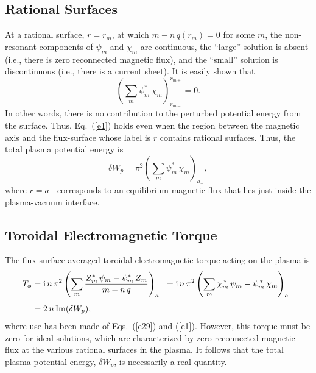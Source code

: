 \documentclass[12pt,prb,aps]{revtex4-1}
\begin{document}
\subsection{Rational Surfaces}
At a rational surface, $r=r_m$, at which $m-n\,q(r_m)=0$ for some $m$, the non-resonant components of $\psi_m$ and $\chi_m$ are continuous, the 
``large'' solution is absent (i.e., there is zero reconnected magnetic flux), and the ``small'' solution is discontinuous (i.e., there is a current sheet). It is easily shown that\,\cite{tj}
\begin{equation}
\left(\sum_m\psi_m^\ast\,\chi_m\right)_{r_{m-}}^{r_{m+}}=0.
\end{equation}
In other words, there is no contribution to the perturbed potential energy from the surface. Thus, Eq.~(\ref{e1}) holds even when the region between the
magnetic axis and the flux-surface whose label is $r$ contains rational surfaces. 
Thus, the total plasma potential energy is 
\begin{equation}\label{a32}
\delta W_p =\pi^2\left(\sum_m\psi_m^\ast\,\chi_m\right)_{a_-},
\end{equation}
where $r=a_-$ corresponds to an equilibrium magnetic flux that lies just inside the plasma-vacuum interface. 

\subsection{Toroidal Electromagnetic Torque}
The flux-surface averaged toroidal electromagnetic torque acting on the plasma   is\,\cite{tj,ideal}
\begin{align}
T_\phi& = {\rm i}\,n\,\pi^2\left(\sum_m\frac{Z_m^\ast\,\psi_m-\psi_m^\ast\,Z_m}{m-n\,q}\right)_{a_-}= {\rm i}\,n\,\pi^2\left(\sum_m
\chi_m^{\,\ast}\,\psi_m - \psi_m^{\,\ast}\,\chi_m\right)_{a_-}\nonumber\\[0.5ex]
&= 2\,n\,{\rm Im}(\delta W_p),
\end{align}
where use has been made of Eqs.~(\ref{e29}) and (\ref{e1}). 
However, this torque must be zero for ideal solutions, which are characterized by zero reconnected magnetic flux at the various rational surfaces in the plasma.\cite{tj}
It follows that
 the total plasma potential energy, $\delta W_p$, is necessarily a real quantity. 
 
\end{document}
